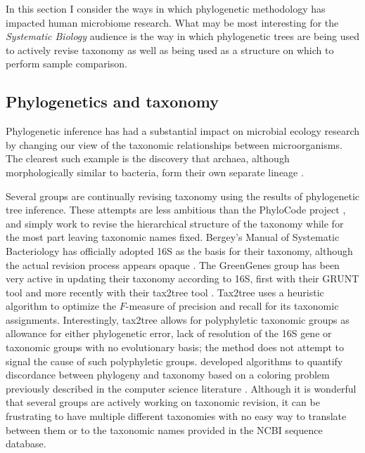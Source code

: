 \documentclass{amsart}
\begin{document}
In this section I consider the ways in which phylogenetic methodology has impacted human microbiome research.
What may be most interesting for the \textit{Systematic Biology} audience is the way in which phylogenetic trees are being used to actively revise taxonomy as well as being used as a structure on which to perform sample comparison.

\subsection{Phylogenetics and taxonomy}

Phylogenetic inference has had a substantial impact on microbial ecology research by changing our view of the taxonomic relationships between microorganisms.
The clearest such example is the discovery that archaea, although morphologically similar to bacteria, form their own separate lineage \citep{woese1977phylogenetic}.

Several groups are continually revising taxonomy using the results of phylogenetic tree inference.
These attempts are less ambitious than the PhyloCode project \citep[to develop a taxonomic scheme expressed directly in terms of a phylogeny; see][]{forey2001phylocode}, and simply work to revise the hierarchical structure of the taxonomy while for the most part leaving taxonomic names fixed.
Bergey's Manual of Systematic Bacteriology has officially adopted 16S as the basis for their taxonomy, although the actual revision process appears opaque \citep{kreig1984bergey}.
The GreenGenes group \citep{desantis2006greengenes} has been very active in updating their taxonomy according to 16S, first with their GRUNT tool \citep{dalevi2007automated} and more recently with their tax2tree tool \citep{mcdonald2011improved}.
Tax2tree uses a heuristic algorithm to optimize the $F$-measure of precision and recall for its taxonomic assignments.
Interestingly, tax2tree allows for polyphyletic taxonomic groups as allowance for either phylogenetic error, lack of resolution of the 16S gene or taxonomic groups with no evolutionary basis; the method does not attempt to signal the cause of such polyphyletic groups.
\citet{matsen2012reconciling} developed algorithms to quantify discordance between phylogeny and taxonomy based on a coloring problem previously described in the computer science literature \citep{moran2008convex}.
Although it is wonderful that several groups are actively working on taxonomic revision, it can be frustrating to have multiple different taxonomies with no easy way to translate between them or to the taxonomic names provided in the NCBI sequence database.
\end{document}
